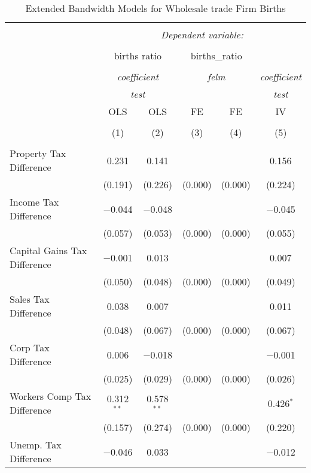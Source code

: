 
\begin{table}[!htbp] \centering 
  \caption{Extended Bandwidth Models for  Wholesale trade Firm Births} 
  \label{} 
\begin{tabular}{@{\extracolsep{5pt}}lccccc} 
\\[-1.8ex]\hline 
\hline \\[-1.8ex] 
 & \multicolumn{5}{c}{\textit{Dependent variable:}} \\ 
\cline{2-6} 
\\[-1.8ex] & \multicolumn{2}{c}{births ratio} & \multicolumn{2}{c}{births\_ratio} &   \\ 
\\[-1.8ex] & \multicolumn{2}{c}{\textit{coefficient}} & \multicolumn{2}{c}{\textit{felm}} & \textit{coefficient} \\ 
 & \multicolumn{2}{c}{\textit{test}} & \multicolumn{2}{c}{\textit{}} & \textit{test} \\ 
 & OLS & OLS & FE & FE & IV \\ 
\\[-1.8ex] & (1) & (2) & (3) & (4) & (5)\\ 
\hline \\[-1.8ex] 
 Property Tax Difference & 0.231 & 0.141 &  &  & 0.156 \\ 
  & (0.191) & (0.226) & (0.000) & (0.000) & (0.224) \\ 
  Income Tax Difference & $-$0.044 & $-$0.048 &  &  & $-$0.045 \\ 
  & (0.057) & (0.053) & (0.000) & (0.000) & (0.055) \\ 
  Capital Gains Tax Difference & $-$0.001 & 0.013 &  &  & 0.007 \\ 
  & (0.050) & (0.048) & (0.000) & (0.000) & (0.049) \\ 
  Sales Tax Difference & 0.038 & 0.007 &  &  & 0.011 \\ 
  & (0.048) & (0.067) & (0.000) & (0.000) & (0.067) \\ 
  Corp Tax Difference & 0.006 & $-$0.018 &  &  & $-$0.001 \\ 
  & (0.025) & (0.029) & (0.000) & (0.000) & (0.026) \\ 
  Workers Comp Tax Difference & 0.312$^{**}$ & 0.578$^{**}$ &  &  & 0.426$^{*}$ \\ 
  & (0.157) & (0.274) & (0.000) & (0.000) & (0.220) \\ 
  Unemp. Tax Difference & $-$0.046 & 0.033 &  &  & $-$0.012 \\ 

\end{tabular}
\end{table}
